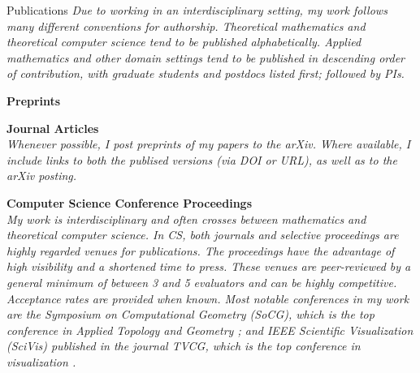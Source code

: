 \documentclass{resume} %
\begin{document}
\begin{rSection}{Publications}
\textit{Due to working in an interdisciplinary setting, my work follows many different conventions for authorship.
Theoretical mathematics and theoretical computer science tend to be published alphabetically.
Applied mathematics and other domain settings tend to be published in descending order of contribution, with graduate students and postdocs listed first; followed by PIs.
}
%
%


\nocite{*}

\textbf{Preprints}
\printbibliography[keyword = inSubmission, heading=none]


\textbf{Journal Articles}\\
\textit{Whenever possible, I post preprints of my papers to the arXiv. Where available, I include links to both the publised versions (via DOI or URL), as well as to the arXiv posting.}
\printbibliography[keyword = journal, heading=none]


\textbf{Computer Science Conference Proceedings}\\
\textit{My work is interdisciplinary and often crosses between mathematics and theoretical computer science.
In CS, both journals and selective proceedings are highly regarded venues for publications.
The proceedings have the advantage of high visibility and a shortened time to press. These venues are peer-reviewed by a general minimum of between 3 and 5 evaluators and can be highly competitive. Acceptance rates are provided when known. Most notable conferences in my work are the \emph{Symposium on Computational Geometry (SoCG)}, which is the top conference in Applied Topology and Geometry \cite{Chambers2020,Munch2016,Bauer2015b}; and IEEE Scientific Visualization (SciVis) published in the journal TVCG, which is the top conference in visualization \cite{Yan2019a}.}
\printbibliography[keyword = conferenceTop, heading=none]



\end{rSection}
\end{document}
